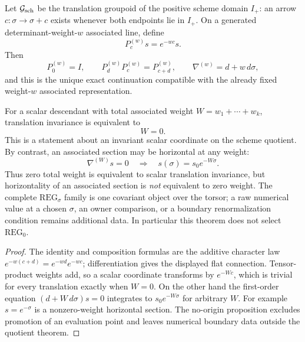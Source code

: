 \documentclass[12pt,a4paper]{article}
\begin{document}
\begin{theorem}
\label{p3c:thm:exact-scheme-continuation-quotient}
Let \(\mathcal G_{\rm sch}\) be the translation groupoid of the positive
scheme domain \(I_+\): an arrow \(c:\sigma\to\sigma+c\) exists whenever both
endpoints lie in \(I_+\).  On a generated determinant-weight-\(w\) associated
line, define
\[
 P_c^{(w)}s=e^{-wc}s.
\]
Then
\[
 P_0^{(w)}=I,\qquad
 P_d^{(w)}P_c^{(w)}=P_{c+d}^{(w)},\qquad
 \nabla^{(w)}=d+w\,d\sigma,
\]
and this is the unique exact continuation compatible with the already fixed
weight-\(w\) associated representation.

For a scalar descendant with total associated weight
\(W=w_1+\cdots+w_k\), translation invariance is equivalent to
\[
 \boxed{W=0.}
\]
This is a statement about an invariant scalar coordinate on the scheme
quotient.  By contrast, an associated section may be horizontal at any
weight:
\[
 \nabla^{(W)}s=0
 \quad\Longrightarrow\quad
 s(\sigma)=s_0e^{-W\sigma}.
\]
Thus zero total weight is equivalent to scalar translation invariance, but
horizontality of an associated section is \emph{not} equivalent to zero
weight.  The complete \(\mathrm{REG}_\sigma\) family is one covariant object
over the torsor; a raw numerical value at a chosen \(\sigma\), an owner
comparison, or a boundary renormalization condition remains additional data.
In particular this theorem does not select \(\mathrm{REG}_0\).
\end{theorem}

\begin{proof}
The identity and composition formulas are the additive character law
\(e^{-w(c+d)}=e^{-wd}e^{-wc}\); differentiation gives the displayed flat
connection.  Tensor-product weights add, so a scalar coordinate transforms by
\(e^{-Wc}\), which is trivial for every translation exactly when \(W=0\).
On the other hand the first-order equation
\((d+W\,d\sigma)s=0\) integrates to \(s_0e^{-W\sigma}\) for arbitrary
\(W\).  For example \(s=e^{-\sigma}\) is a nonzero-weight horizontal section.
The no-origin proposition excludes promotion of an evaluation point and
leaves numerical boundary data outside the quotient theorem.
\end{proof}
\end{document}
